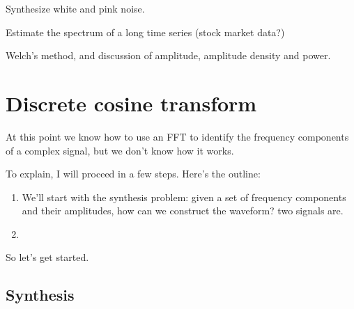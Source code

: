 \documentclass[12pt]{book}
\begin{document}
Synthesize white and pink noise.

Estimate the spectrum of a long time series (stock market data?)

Welch's method, and discussion of amplitude, amplitude density and power.


\chapter{Discrete cosine transform}

At this point we know how to use an FFT to identify the frequency
components of a complex signal, but we don't know how it works.

To explain, I will proceed in a few steps.  Here's the outline:

\begin{enumerate}

\item We'll start with the synthesis problem: given a set of frequency
components and their amplitudes, how can we construct the waveform?
two signals are.

\item 

\end{enumerate}

So let's get started.


\section{Synthesis}


\begin{verbatim}
\end{verbatim}


\begin{verbatim}
\end{verbatim}


\begin{verbatim}
\end{verbatim}


\begin{verbatim}
\end{verbatim}


\begin{verbatim}
\end{verbatim}


\begin{verbatim}
\end{verbatim}


\begin{verbatim}
\end{verbatim}
\end{document}
